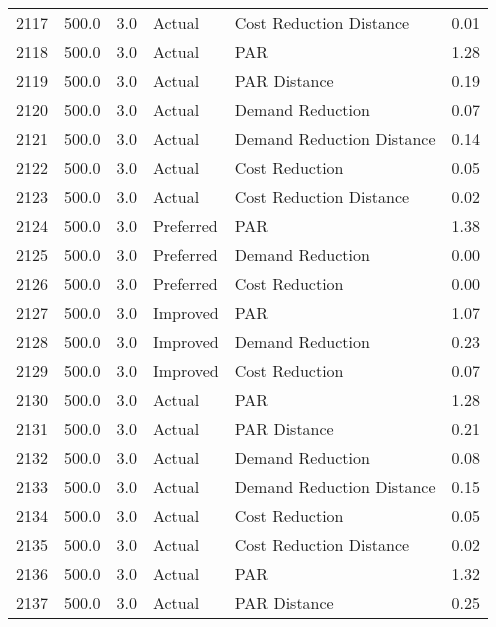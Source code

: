 \begin{longtable}{lrrllr}
2117 &        500.0 &     3.0 &         Actual &    Cost Reduction Distance &   0.01 \\
2118 &        500.0 &     3.0 &         Actual &                        PAR &   1.28 \\
2119 &        500.0 &     3.0 &         Actual &               PAR Distance &   0.19 \\
2120 &        500.0 &     3.0 &         Actual &           Demand Reduction &   0.07 \\
2121 &        500.0 &     3.0 &         Actual &  Demand Reduction Distance &   0.14 \\
2122 &        500.0 &     3.0 &         Actual &             Cost Reduction &   0.05 \\
2123 &        500.0 &     3.0 &         Actual &    Cost Reduction Distance &   0.02 \\
2124 &        500.0 &     3.0 &      Preferred &                        PAR &   1.38 \\
2125 &        500.0 &     3.0 &      Preferred &           Demand Reduction &   0.00 \\
2126 &        500.0 &     3.0 &      Preferred &             Cost Reduction &   0.00 \\
2127 &        500.0 &     3.0 &       Improved &                        PAR &   1.07 \\
2128 &        500.0 &     3.0 &       Improved &           Demand Reduction &   0.23 \\
2129 &        500.0 &     3.0 &       Improved &             Cost Reduction &   0.07 \\
2130 &        500.0 &     3.0 &         Actual &                        PAR &   1.28 \\
2131 &        500.0 &     3.0 &         Actual &               PAR Distance &   0.21 \\
2132 &        500.0 &     3.0 &         Actual &           Demand Reduction &   0.08 \\
2133 &        500.0 &     3.0 &         Actual &  Demand Reduction Distance &   0.15 \\
2134 &        500.0 &     3.0 &         Actual &             Cost Reduction &   0.05 \\
2135 &        500.0 &     3.0 &         Actual &    Cost Reduction Distance &   0.02 \\
2136 &        500.0 &     3.0 &         Actual &                        PAR &   1.32 \\
2137 &        500.0 &     3.0 &         Actual &               PAR Distance &   0.25 \\

\end{longtable}
